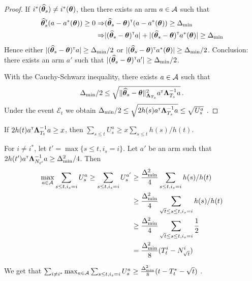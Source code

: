 \begin{proof}
If $i^*(\widehat{{\boldsymbol \theta}}_s) \neq i^*({\boldsymbol \theta})$, then there exists an arm $a\in\mathcal{A}$ such that
\begin{align*}
\widehat{{\boldsymbol \theta}}_s^{\mathsf{\scriptscriptstyle T}}(a - a^*({\boldsymbol \theta})) \ge 0
\Rightarrow & (\widehat{{\boldsymbol \theta}}_s - {\boldsymbol \theta})^{\mathsf{\scriptscriptstyle T}} (a - a^*({\boldsymbol \theta})) \ge \Delta_{\min}
\\
\Rightarrow & | (\widehat{{\boldsymbol \theta}}_s - {\boldsymbol \theta})^{\mathsf{\scriptscriptstyle T}} a | + | (\widehat{{\boldsymbol \theta}}_s - {\boldsymbol \theta})^{\mathsf{\scriptscriptstyle T}} a^*({\boldsymbol \theta}) | \ge \Delta_{\min}
\end{align*}
Hence either $| (\widehat{{\boldsymbol \theta}}_s - {\boldsymbol \theta})^{\mathsf{\scriptscriptstyle T}} a | \ge \Delta_{\min}/2$ or $| (\widehat{{\boldsymbol \theta}}_s - {\boldsymbol \theta})^{\mathsf{\scriptscriptstyle T}} a^*({\boldsymbol \theta}) | \ge \Delta_{\min}/2$. Conclusion: there exists an arm $a'$ such that $| (\widehat{{\boldsymbol \theta}}_s - {\boldsymbol \theta})^{\mathsf{\scriptscriptstyle T}} a' | \ge \Delta_{\min}/2$.

With the Cauchy-Schwarz inequality, there exists $a\in\mathcal{A}$ such that
\[
    \Delta_{\min}/2 \le \sqrt{\Vert \widehat{{\boldsymbol \theta}}_s - {\boldsymbol \theta} \Vert^2_{{\boldsymbol \Lambda}_{T_s}} a^{\mathsf{\scriptscriptstyle T}} {\boldsymbol \Lambda}_{T_s}^{-1}a}\,.
\]
Under the event $\mathcal E_t$ we obtain $\Delta_{\min}/2 \le \sqrt{2 h(s) a^{\mathsf{\scriptscriptstyle T}} {\boldsymbol \Lambda}_{T_s}^{-1}a} \le \sqrt{U_s^a}$ .
\end{proof}

\begin{lemma}
If $2h(t)a^{\mathsf{\scriptscriptstyle T}} {\boldsymbol \Lambda}_{T_t}^{-1}a \ge x$, then $\sum_{s\le t} U_s^a \ge x \sum_{s\le t} h(s)/h(t)$.
\end{lemma}

For $i\neq i^*$, let $t'= \max\{s\le t, i_s = i\}$. Let $a'$ be an arm such that $2h(t')a^{\mathsf{\scriptscriptstyle T}} {\boldsymbol \Lambda}_{N_{t'}}^{-1}a \ge \Delta_{\min}^2/4$. Then
\begin{align*}
\max_{a\in \mathcal{A}}\sum_{s\le t, i_s=i} U_s^a
\ge \sum_{s\le t, i_s=i} U_s^{a'}
&\ge \frac{\Delta_{\min}^2}{4} \sum_{s\le t, i_s=i} h(s)/h(t)
\\
&\ge \frac{\Delta_{\min}^2}{4} \sum_{\sqrt{t} \le s\le t, i_s=i} h(s)/h(t)
\\
&\ge \frac{\Delta_{\min}^2}{4} \sum_{\sqrt{t} \le s\le t, i_s=i} \frac{1}{2}
\\
&= \frac{\Delta_{\min}^2}{8} (T_t^i - N_{\sqrt{t}}^i)
\end{align*}

We get that $\sum_{i\neq i^*}\max_{a\in \mathcal{A}}\sum_{s\le t, i_s=i} U_s^a \ge \frac{\Delta_{\min}^2}{8} (t - T_t^* - \sqrt{t})$ .

